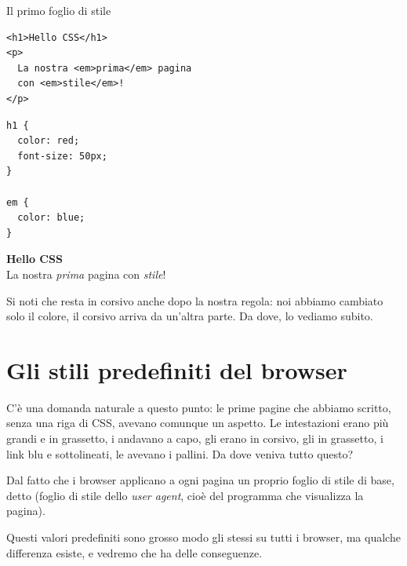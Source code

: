 \begin{esempio}{Il primo foglio di stile}
\begin{affianco}[0.5]
\begin{lstlisting}[style=html, name=index.html]
<h1>Hello CSS</h1>
<p>
  La nostra <em>prima</em> pagina
  con <em>stile</em>!
</p>
\end{lstlisting}

\begin{lstlisting}[style=css, name=style.css]
h1 {
  color: red;
  font-size: 50px;
}

em {
  color: blue;
}
\end{lstlisting}
\risultato
\begin{browser}
  {\Lora\bfseries\Huge\textcolor{css-red}{Hello CSS}}\\[6pt]
  La nostra \textcolor{css-blue}{\textit{prima}} pagina con
  \textcolor{css-blue}{\textit{stile}}!
\end{browser}
\end{affianco}

Si noti che  resta in corsivo anche dopo la nostra regola: noi abbiamo
cambiato solo il colore, il corsivo arriva da un'altra parte. Da dove, lo
vediamo subito.
\end{esempio}

\section{Gli stili predefiniti del browser}

C'è una domanda naturale a questo punto: le prime pagine che abbiamo scritto,
senza una riga di CSS, avevano comunque un aspetto. Le intestazioni erano più
grandi e in grassetto, i  andavano a capo, gli  erano in corsivo,
gli  in grassetto, i link blu e sottolineati, le  avevano i
pallini. Da dove veniva tutto questo?

Dal fatto che i browser applicano a ogni pagina un proprio foglio di stile di
base, detto  (foglio di stile dello \textit{user
agent}, cioè del programma che visualizza la pagina).

Questi valori predefiniti sono grosso modo gli stessi su tutti i browser, ma
qualche differenza esiste, e vedremo che ha delle conseguenze.


